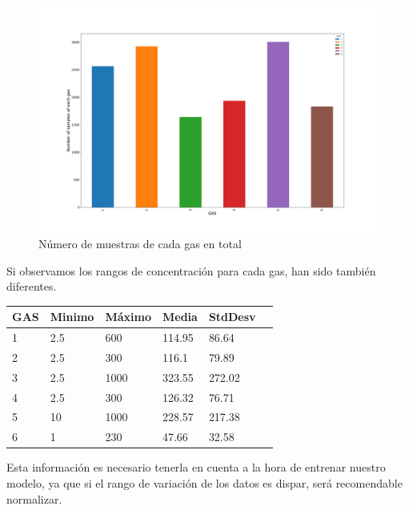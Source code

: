 \begin{figure}[ht!]
	\centering
	\includegraphics[width=\columnwidth]{../py_imgs/Step0_Count_Gas.png}
	\caption{Número de muestras de cada gas en total}
	\label{fig: gasCount}
\end{figure}

Si observamos los rangos de concentración para cada gas, han sido también diferentes.

\begin{table}
    \centering
    \begin{tabular}{|l|l|l|l|l|l|}
    \hline
    GAS & Minimo & Máximo & Media  & StdDesv \\ \hline
        1 & 2.5 & 600    & 114.95 & 86.64          \\ \hline
        2 & 2.5 & 300    & 116.1  & 79.89          \\ \hline
        3 & 2.5 & 1000   & 323.55 & 272.02         \\ \hline
        4 & 2.5 & 300    & 126.32 & 76.71          \\ \hline
        5 & 10  & 1000   & 228.57 & 217.38         \\ \hline
        6 & 1   & 230    & 47.66  & 32.58          \\ \hline
    \end{tabular}
\end{table}

Esta información es necesario tenerla en cuenta a la hora de entrenar nuestro modelo, ya que
si el rango de variación de los datos es dispar, será recomendable normalizar.





